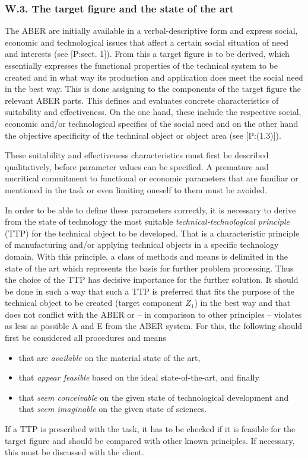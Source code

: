\documentclass[11pt,a4paper]{article}
\begin{document}
\subsubsection*{W.3. The target figure and the state of the art}

The ABER are initially available in a verbal-descriptive form and express
social, economic and technological issues that affect a certain social
situation of need and interests (see [P:sect. 1]). From this a target figure
is to be derived, which essentially expresses the functional properties of the
technical system to be created and in what way its production and application
does meet the social need in the best way. This is done assigning to the
components of the target figure the relevant ABER parts. This defines and
evaluates concrete characteristics of suitability and effectiveness. On the
one hand, these include the respective social, economic and/or technological
specifics of the social need and on the other hand the objective specificity
of the technical object or object area (see [P:(1.3)]).

These suitability and effectiveness characteristics must first be described
qualitatively, before parameter values can be specified. A premature and
uncritical commitment to functional or economic parameters that are familiar
or mentioned in the task or even limiting oneself to them must be avoided.

In order to be able to define these parameters correctly, it is necessary to
derive from the state of technology the most suitable
\emph{technical-technological principle} (TTP) for the technical object to be
developed. That is a characteristic principle of manufacturing and/or applying
technical objects in a specific technology domain. With this principle, a
class of methods and means is delimited in the state of the art which
represents the basis for further problem processing. Thus the choice of the
TTP has decisive importance for the further solution. It should be done in
such a way that such a TTP is preferred that fits the purpose of the technical
object to be created (target component $Z_1$) in the best way and that does
not conflict with the ABER or -- in comparison to other principles -- violates
as less as possible A and E from the ABER system. For this, the following
should first be considered all procedures and means 
\begin{itemize}
\item that are \emph{available} on the material state of the art,
\item that \emph{appear feasible} based on the ideal state-of-the-art, and
  finally
\item that \emph{seem conceivable} on the given state of technological
  development and that \emph{seem imaginable} on the given state of sciences.
\end{itemize}
If a TTP is prescribed with the task, it has to be checked if it is feasible
for the target figure and should be compared with other known principles.  If
necessary, this must be discussed with the client.
\end{document}
